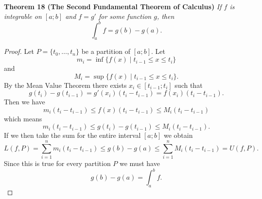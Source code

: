 \documentclass{article}
\begin{document}
\begin{flushleft}
\textbf{Theorem 18 (The Second Fundamental Theorem of Calculus)}
\textsl{If $f$ is integrable on $[a;b]$ and $f=g'$ for some function $g$, then
\[
\int_a^b f = g(b)-g(a).
\]}
\begin{proof}
Let $P = \{t_0, \dots , t_n\}$ be a partition of $[a;b]$. Let
\[
m_i = \inf \{f(x) \mid t_{i-1} \leq x \leq t_i\}
\]
and
\[
M_i = \sup \{f(x) \mid t_{i-1} \leq x \leq t_i\}.
\]
By the Mean Value Theorem there exists $x_i \in [t_{i-1}; t_i]$ such that
\[
g(t_i) - g(t_{i-1}) = g'(x_i) (t_i-t_{i-1}) = f(x_i) (t_i-t_{i-1}).
\]
Then we have
\[
m_i (t_i-t_{i-1}) \leq f(x) (t_i-t_{i-1}) \leq M_i (t_i - t_{i-1})
\]
which means
\[
m_i (t_i-t_{i-1}) \leq g(t_i) - g(t_{i-1}) \leq M_i (t_i - t_{i-1}).
\]
If we then take the sum for the entire interval $[a;b]$ we obtain
\[
L(f,P) = \sum_{i=1}^n m_i (t_i-t_{i-1}) \leq g(b) - g(a) \leq \sum_{i=1}^n M_i (t_i-t_{i-1}) = U(f,P).
\]
Since this is true for every partition $P$ we must have
\[
g(b) - g(a) = \int_a^b f.
\]
\end{proof}

\end{flushleft}
\end{document}

